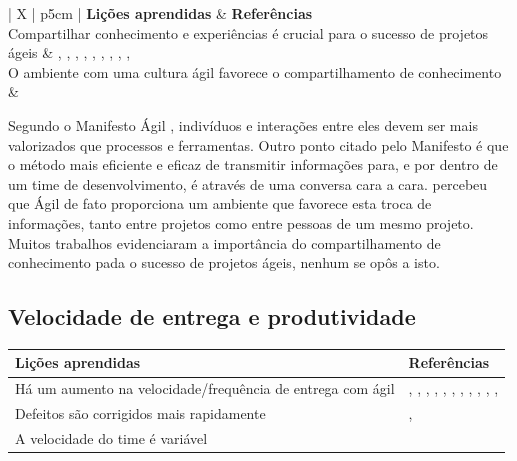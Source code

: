 \begin{table}[H]
	\centering
	\begin{tabularx}{\linewidth}{ | X | p{5cm} | } \hline \textbf{Lições aprendidas} & \textbf{Referências} \\ \hline
		Compartilhar conhecimento e experiências é crucial para o sucesso de projetos ágeis & \cite{Asnawi2012}, \cite{Cisco2011}, \cite{Lapham2012}, \cite{Radha2012}, \cite{Eunha2012}, \cite{Valerio2013}, \cite{Vieira2013}, \cite{Queiroz2013}, \cite{Bastos2013}, \cite{Maciel2013} \\ \hline
		O ambiente com uma cultura ágil favorece o compartilhamento de conhecimento & \cite{Ericsson2013} \\ \hline
	\end{tabularx}
\end{table}

Segundo o Manifesto Ágil \cite{agileManifesto}, indivíduos e interações entre eles devem ser mais valorizados que processos e ferramentas. Outro ponto citado pelo Manifesto é que o método mais eficiente e eficaz de transmitir informações para, e por dentro de um time de desenvolvimento, é através de uma conversa cara a cara. \cite{Ericsson2013} percebeu que Ágil de fato proporciona um ambiente que favorece esta troca de informações, tanto entre projetos como entre pessoas de um mesmo projeto. Muitos trabalhos evidenciaram a importância do compartilhamento de conhecimento pada o sucesso de projetos ágeis, nenhum se opôs a isto.

\subsection{Velocidade de entrega e produtividade}

\begin{table}[H]
	\centering
	\begin{tabularx}{\linewidth}{ | X | p{5cm} | } \hline \textbf{Lições aprendidas} & \textbf{Referências} \\ \hline
		Há um aumento na velocidade/frequência de entrega com ágil & \cite{Adobe2012}, \cite{Fitzgerald2013}, \cite{Microsoft2013}, \cite{Cisco2011}, \cite{Korhonen2010}, \cite{Eunha2012}, \cite{Claudia2013}, \cite{Stefano2013}, \cite{Queiroz2013}, \cite{Maciel2013}, \cite{Hui2013}, \cite{Ahmed2008} \\ \hline
		Defeitos são corrigidos mais rapidamente & \cite{Microsoft2013}, \cite{Korhonen2010} \\ \hline
		A velocidade do time é variável & \cite{Piegas2012} \\ \hline
	\end{tabularx}
\end{table}

